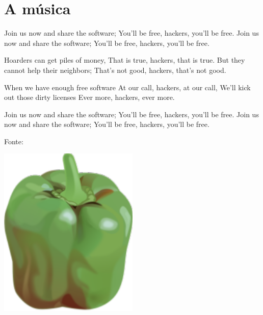 \documentclass[a4paper, 11pt]{article}
\begin{document}


\tableofcontents

\section{A música}
Join us now and share the software;
You'll be free, hackers, you'll be free.
Join us now and share the software;
You'll be free, hackers, you'll be free.

Hoarders can get piles of money,
That is true, hackers, that is true.
But they cannot help their neighbors;
That's not good, hackers, that's not good.

When we have enough free software
At our call, hackers, at our call,
We'll kick out those dirty licenses
Ever more, hackers, ever more.

Join us now and share the software;
You'll be free, hackers, you'll be free.
Join us now and share the software;
You'll be free, hackers, you'll be free.

Fonte: \cite{fsf-song}

\begin{center}
	\includegraphics[width=0.5\textwidth]{pepper.png}
\end{center}

\printbibliography[heading=bibintoc, title=Referências]
\end{document}
